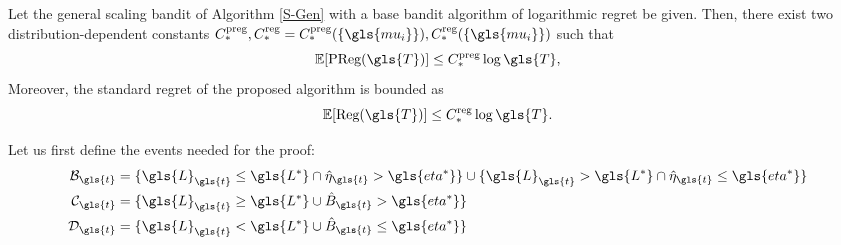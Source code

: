 \begin{theorem}
\label{thm_pullregret}
Let the general scaling bandit of Algorithm \ref{S-Gen} with a base bandit algorithm of logarithmic regret be given. Then, there exist two distribution-dependent constants $C_*^{\mathrm{preg}},C_*^{\mathrm{reg}} = C_*^{\mathrm{preg}}(\{\gls{mu_i}\}), C_*^{\mathrm{reg}}(\{\gls{mu_i}\})$ such that
\begin{equation}\label{ineq_pregsublin}
\mathbb{E}[\text{PReg}(\gls{T})] \le C_*^{\mathrm{preg}} \log \gls{T},
\end{equation}
Moreover, the standard regret of the proposed algorithm is bounded as
\begin{equation}\label{ineq_regsublin}
\mathbb{E}[\text{Reg}(\gls{T})] \le C_*^{\mathrm{reg}} \log \gls{T}.
\end{equation}
\end{theorem}%
Let us first define the events needed for the proof:
\begin{align}
\mB_{\gls{t}} &= \{\gls{L}_{\gls{t}} \le \gls{L^*} \cap \hat{\eta}_{\gls{t}} > \gls{eta^*}\} \cup \{\gls{L}_{\gls{t}} > \gls{L^*} \cap \hat{\eta}_{\gls{t}} \le \gls{eta^*}\} \\
\mC_{\gls{t}} &= \{\gls{L}_{\gls{t}} \ge \gls{L^*} \cup \hat{B}_{\gls{t}} > \gls{eta^*}\} \\
\mD_{\gls{t}} &= \{\gls{L}_{\gls{t}} < \gls{L^*} \cup \hat{B}_{\gls{t}} \le \gls{eta^*}\} 
\end{align}


